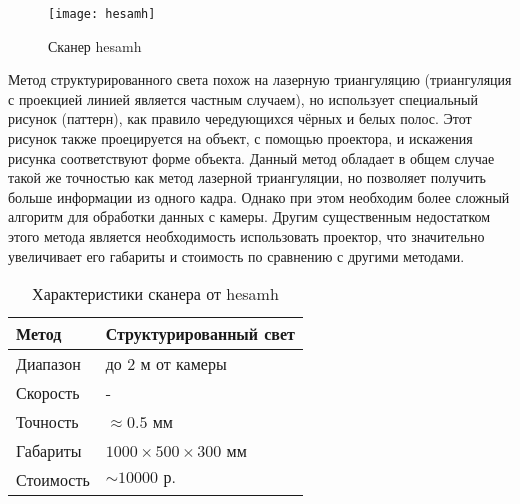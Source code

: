         \begin{figure}[!ht]
            \centering
            \texttt{[image: hesamh]}\label{pic:hesamh}
            \caption{Сканер hesamh}
        \end{figure}
        
        Метод структурированного света похож на лазерную триангуляцию (триангуляция с проекцией линией является частным случаем), но использует специальный рисунок (паттерн), как правило чередующихся чёрных и белых полос. Этот рисунок также проецируется на объект, с помощью проектора, и искажения рисунка соответствуют форме объекта. Данный метод обладает в общем случае такой же точностью как метод лазерной триангуляции, но позволяет получить больше информации из одного кадра. Однако при этом необходим более сложный алгоритм для обработки данных с камеры. Другим существенным недостатком этого метода является необходимость использовать проектор, что значительно увеличивает его габариты и стоимость по сравнению с другими методами.
        
        \begin{table}[H]
            \centering
            \caption{Характеристики сканера от hesamh}\label{table:hesamh}
            \begin{tabular}{|l|l|}\hline
            Метод&Структурированный свет\\ \hline
            Диапазон&до 2 м от камеры\\ \hline
            Скорость&-\\ \hline
            Точность&$\approx 0.5$ мм\\ \hline
            Габариты&$ 1000 \times 500 \times 300 $ мм\\ \hline
            Стоимость&$\sim 10 000\text{ р.}$\\ \hline
            \end{tabular}
        \end{table}